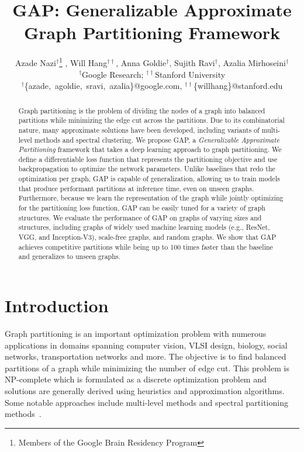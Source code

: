 \documentclass[10pt,twocolumn]{article}
\title{GAP: Generalizable Approximate Graph Partitioning Framework}
\author
{
Azade Nazi$^{\dag}$\footnote{Members of the Google Brain Residency Program} ,
Will Hang$^{\dag\dag}$,
Anna Goldie$^{\dag}$,
Sujith Ravi$^{\dag}$, 
Azalia Mirhoseini$^{\dag}$
\\
$^{\dag}$Google Research;
$^{\dag\dag}$Stanford University
\\
$^{\dag}$\small{\{azade,~agoldie,~sravi,~azalia\}@google.com},
$^{\dag\dag}$\small{\{willhang\}@stanford.edu}
}
\date{}
\begin{document}
\maketitle
\begin{abstract}







Graph partitioning is the problem of dividing the nodes of a graph into balanced partitions while minimizing the edge cut across the partitions. Due to its combinatorial nature, many approximate solutions have been developed, including variants of multi-level methods and spectral clustering. We propose GAP, a {\it Generalizable Approximate Partitioning} framework that takes a deep learning approach to graph partitioning. We define a differentiable loss function that represents the partitioning objective and use backpropagation to optimize the network parameters. Unlike baselines that redo the optimization per graph, GAP is capable of generalization, allowing us to train models that produce performant partitions at inference time, even on unseen graphs. Furthermore, because we learn the representation of the graph while jointly optimizing for the partitioning loss function, GAP can be easily tuned for a variety of graph structures. We evaluate the performance of GAP on graphs of varying sizes and structures, including graphs of widely used machine learning models (e.g., ResNet, VGG, and Inception-V3), scale-free graphs, and random graphs. We show that GAP achieves competitive partitions while being up to 100 times faster than the baseline and generalizes to unseen graphs.
\end{abstract}


\section{Introduction}
\label{sec:intro}




Graph partitioning is an important optimization problem with numerous applications in domains spanning computer vision, VLSI design, biology, social networks, transportation networks and more. The objective is to find balanced partitions of a graph while minimizing the number of edge cut. This problem is NP-complete which is formulated as a discrete optimization problem and solutions are generally derived using heuristics and approximation algorithms. Some notable approaches include multi-level methods and spectral partitioning methods~\cite{karypis_1998, karypis_1999, karypis_2000, miettinen_2006, andersen2006, chung2007gp}.
\end{document}
